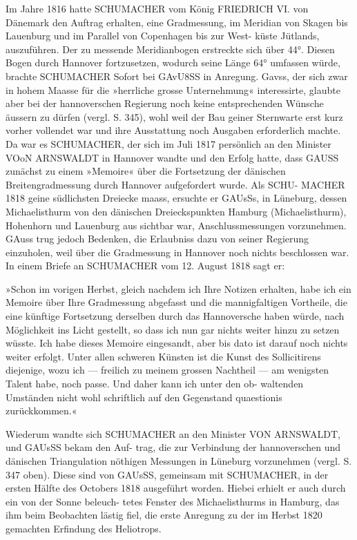 \documentclass[12pt,a4paper]{article}
\theoremstyle{plain}
\theoremstyle{definition}
\theoremstyle{remark}
\begin{document}
\noindent
Im Jahre 1816 hatte SCHUMACHER vom König FRIEDRICH VI. von Dänemark den Auftrag erhalten,
eine Gradmessung, im Meridian von Skagen bis Lauenburg und im Parallel von Copenhagen bis zur West-
küste Jütlands, auszuführen. Der zu messende Meridianbogen erstreckte sich über 44°. Diesen Bogen durch
Hannover fortzusetzen, wodurch seine Länge 64° umfassen würde, brachte SCHUMACHER Sofort bei GAvU8SS in
Anregung. Gavss, der sich zwar in hohem Maasse für die »herrliche grosse Unternehmung« interessirte,
glaubte aber bei der hannoverschen Regierung noch keine entsprechenden Wünsche äussern zu dürfen (vergl.
S. 345), wohl weil der Bau geiner Sternwarte erst kurz vorher vollendet war und ihre Ausstattung noch
Ausgaben erforderlich machte. Da war es SCHUMACHER, der sich im Juli 1817 persönlich an den Minister
VOoN ARNSWALDT in Hannover wandte und den Erfolg hatte, dass GAUSS zunächst zu einem »Memoire«
über die Fortsetzung der dänischen Breitengradmessung durch Hannover aufgefordert wurde. Als SCHU-
MACHER 1818 geine südlichsten Dreiecke maass, ersuchte er GAUsSs, in Lüneburg, dessen Michaelisthurm
von den dänischen Dreieckspunkten Hamburg (Michaelisthurm), Hohenhorn und Lauenburg aus sichtbar
war, Anschlussmessungen vorzunehmen. GAuss trug jedoch Bedenken, die Erlaubniss dazu von seiner
Regierung einzuholen, weil über die Gradmessung in Hannover noch nichts beschlossen war. In einem
Briefe an SCHUMACHER vom 12. August 1818 sagt er:

\noindent
»Schon im vorigen Herbst, gleich nachdem ich Ihre Notizen erhalten, habe ich ein Memoire über
Ihre Gradmessung abgefasst und die mannigfaltigen Vortheile, die eine künftige Fortsetzung derselben durch
das Hannoversche haben würde, nach Möglichkeit ins Licht gestellt, so dass ich nun gar nichts weiter
hinzu zu setzen wüsste. Ich habe dieses Memoire eingesandt, aber bis dato ist darauf noch nichts weiter
erfolgt. Unter allen schweren Künsten ist die Kunst des Sollicitirens diejenige, wozu ich --- freilich zu
meinem grossen Nachtheil --- am wenigsten Talent habe, noch passe. Und daher kann ich unter den ob-
waltenden Umständen nicht wohl schriftlich auf den Gegenstand quaestionis zurückkommen.«

\noindent
Wiederum wandte sich SCHUMACHER an den Minister VON ARNSWALDT, und GAUsSS bekam den Auf-
trag, die zur Verbindung der hannoverschen und dänischen Triangulation nöthigen Messungen in Lüneburg
vorzunehmen (vergl. S. 347 oben). Diese sind von GAUsSS, gemeinsam mit SCHUMACHER, in der ersten
Hälfte des Octobers 1818 ausgeführt worden. Hiebei erhielt er auch durch ein von der Sonne beleuch-
tetes Fenster des Michaelisthurms in Hamburg, das ihm beim Beobachten lästig fiel, die erste Anregung
zu der im Herbst 1820 gemachten Erfindung des Heliotrops.
\end{document}

